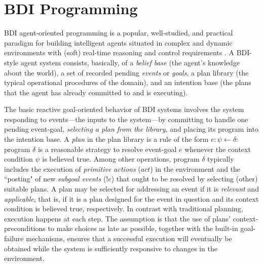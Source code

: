\section{BDI Programming}\label{sec:preliminaries}

BDI agent-oriented programming is a popular, well-studied, and practical paradigm
for building intelligent agents situated in complex and dynamic environments with
(soft) real-time reasoning and control requirements
\cite{Georgeff89-PRS,Benfield:AAMAS06}.
A BDI-style agent system consists, basically, of a \emph{belief base} (the
agent's knowledge about the world), a set of recorded pending \emph{events} or
\emph{goals}, a plan library (the typical operational procedures of the domain),
and an intention base (the plans that the agent has already committed to and is
executing).



The basic reactive goal-oriented behavior of BDI systems involves the system
responding to events---the inputs to the system---by committing to handle one
pending event-goal, \textit{selecting a plan from the library}, and placing its
program into the intention base.
A \emph{plan} in the plan library is a rule of the form $e: \psi \leftarrow
\delta$: program $\delta$ is a reasonable strategy to resolve event-goal $e$
whenever the context condition $\psi$ is believed true.
Among other operations, program $\delta$ typically includes the execution of
\emph{primitive actions} ($act$) in the environment and the ``posting" of new
\emph{subgoal events} ($!e$) that ought to be resolved by selecting (other)
suitable plans.
A plan may be selected for addressing an event if it is \textit{relevant} and
\textit{applicable}, that is, if it is a plan designed for the event in question
and its context condition is believed true, respectively.
In contrast with traditional planning, execution happens at each step. The
assumption is that the use of plans' context-preconditions to make choices as
late as possible, together with the built-in goal-failure mechanisms, ensures
that a successful execution will eventually be obtained while the system is
sufficiently responsive to changes in the environment.



